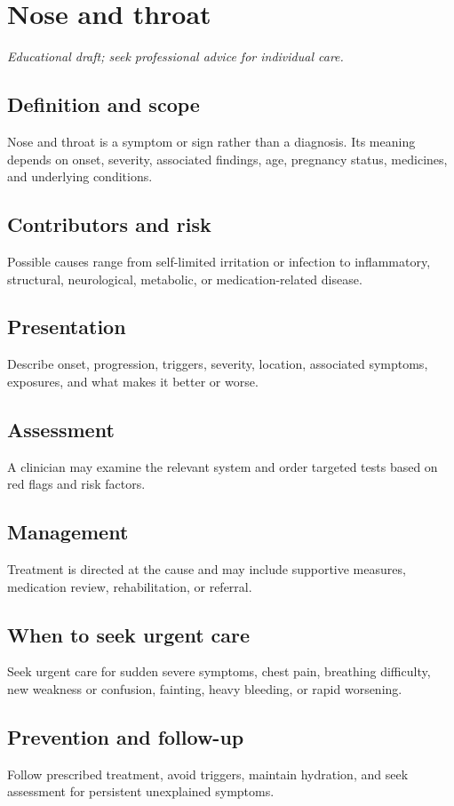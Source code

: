 \chapter{Nose and throat}

\medskip
\noindent\textit{Educational draft; seek professional advice for individual care.}

\section*{Definition and scope}
Nose and throat is a symptom or sign rather than a diagnosis. Its meaning depends on onset, severity, associated findings, age, pregnancy status, medicines, and underlying conditions.

\section*{Contributors and risk}
Possible causes range from self-limited irritation or infection to inflammatory, structural, neurological, metabolic, or medication-related disease.

\section*{Presentation}
Describe onset, progression, triggers, severity, location, associated symptoms, exposures, and what makes it better or worse.

\section*{Assessment}
A clinician may examine the relevant system and order targeted tests based on red flags and risk factors.

\section*{Management}
Treatment is directed at the cause and may include supportive measures, medication review, rehabilitation, or referral.

\section*{When to seek urgent care}
Seek urgent care for sudden severe symptoms, chest pain, breathing difficulty, new weakness or confusion, fainting, heavy bleeding, or rapid worsening.

\section*{Prevention and follow-up}
Follow prescribed treatment, avoid triggers, maintain hydration, and seek assessment for persistent unexplained symptoms.

